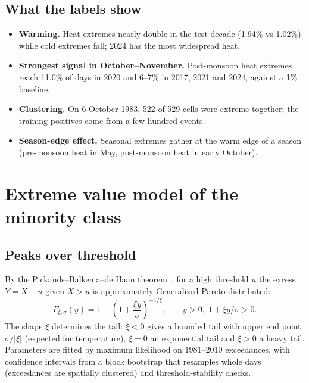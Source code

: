\documentclass[11pt,a4paper]{article}
\begin{document}
\subsection{What the labels show}
\begin{itemize}
  \item \textbf{Warming.} Heat extremes nearly double in the test decade (1.94\% vs 1.02\%) while cold
        extremes fall; 2024 has the most widespread heat.
  \item \textbf{Strongest signal in October--November.} Post-monsoon heat extremes reach 11.0\% of days in
        2020 and 6--7\% in 2017, 2021 and 2024, against a 1\% baseline.
  \item \textbf{Clustering.} On 6 October 1983, 522 of 529 cells were extreme together; the training
        positives come from a few hundred events.
  \item \textbf{Season-edge effect.} Seasonal extremes gather at the warm edge of a season (pre-monsoon
        heat in May, post-monsoon heat in early October).
\end{itemize}

\section{Extreme value model of the minority class}\label{sec:evt}
\subsection{Peaks over threshold}
By the Pickands--Balkema--de Haan theorem~\cite{pickands1975,balkema1974}, for a high threshold $u$ the
excess $Y=X-u$ given $X>u$ is approximately Generalized Pareto distributed:
\begin{equation}
  F_{\xi,\sigma}(y)=1-\left(1+\frac{\xi y}{\sigma}\right)^{-1/\xi},\qquad y>0,\; 1+\xi y/\sigma>0 .
\end{equation}
The shape $\xi$ determines the tail: $\xi<0$ gives a bounded tail with upper end point $\sigma/|\xi|$
(expected for temperature), $\xi=0$ an exponential tail and $\xi>0$ a heavy tail. Parameters are fitted by
maximum likelihood on 1981--2010 exceedances, with confidence intervals from a block bootstrap that
resamples whole days (exceedances are spatially clustered) and threshold-stability checks.
\end{document}
